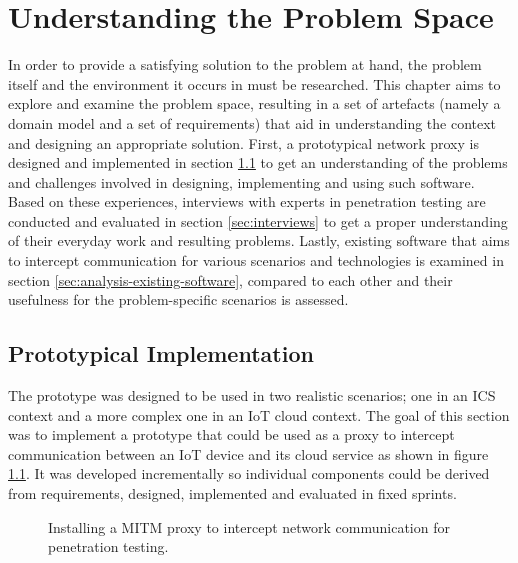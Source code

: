 \chapter{Understanding the Problem Space}
\label{chap:understanding-the-problem-space}
In order to provide a satisfying solution to the problem at hand, the problem itself and the environment it occurs in must be researched. This chapter aims to explore and examine the problem space, resulting in a set of artefacts (namely a domain model and a set of requirements) that aid in understanding the context and designing an appropriate solution. First, a prototypical network proxy is designed and implemented in section \ref{sec:prototypical-implementation} to get an understanding of the problems and challenges involved in designing, implementing and using such software. Based on these experiences, interviews with experts in penetration testing are conducted and evaluated in section \ref{sec:interviews} to get a proper understanding of their everyday work and resulting problems. Lastly, existing software that aims to intercept communication for various scenarios and technologies is examined in section \ref{sec:analysis-existing-software}, compared to each other and their usefulness for the problem-specific scenarios is assessed.

\section{Prototypical Implementation}
\label{sec:prototypical-implementation}
The prototype was designed to be used in two realistic scenarios; one in an \ac{ICS} context and a more complex one in an \ac{IoT} cloud context. The goal of this section was to implement a prototype that could be used as a proxy to intercept communication between an \ac{IoT} device and its cloud service as shown in figure \ref{fig:network-communication-diagrams}. It was developed incrementally so individual components could be derived from requirements, designed, implemented and evaluated in fixed sprints.

\begin{figure}%
    \centering
    \qquad
    \caption{Installing a \ac{MITM} proxy to intercept network communication for penetration testing.}%
    \label{fig:network-communication-diagrams}%
\end{figure}

